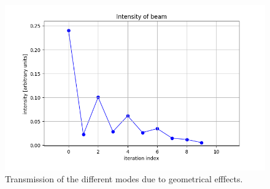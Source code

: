 \documentclass{iucr}              %
\begin{document}
  


\begin{figure}\label{fig:mode transmission}
    \centering
        \includegraphics[width=\textwidth]{GRAPHICS/mode_transmission.png}
    
    \caption{Transmission of the different modes due to geometrical efffects.}
\end{figure}
\end{document}
